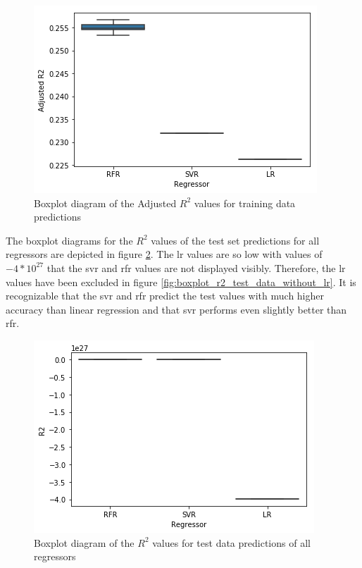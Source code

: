 \documentclass[a4paper, 11pt, oneside]{Thesis}  %
\begin{document}
\begin{figure}[h]
\includegraphics[scale=0.7]{Figures/Regressor_comparison/boxplot_adj_r2_training_data.png}
\centering
\caption{Boxplot diagram of the Adjusted $R^2$ values for training data predictions}
\label{fig:boxplot_adj_r2_training_data}
\end{figure}

The boxplot diagrams for the $R^2$ values of the test set predictions for all regressors are depicted in figure \ref{fig:boxplot_r2_test_data_all}. The \ac{lr} values are so low with values of $-4 * 10^{27}$ that the \ac{svr} and \ac{rfr} values are not displayed visibly. Therefore, the \ac{lr} values have been excluded in figure \ref{fig:boxplot_r2_test_data_without_lr}. It is recognizable that the \ac{svr} and \ac{rfr} predict the test values with much higher accuracy than linear regression and that \ac{svr} performs even slightly better than \ac{rfr}.

\begin{figure}[h]
\includegraphics[scale=0.7]{Figures/Regressor_comparison/boxplot_r2_test_data_all.png}
\centering
\caption{Boxplot diagram of the $R^2$ values for test data predictions of all regressors}
\label{fig:boxplot_r2_test_data_all}
\end{figure}
\end{document}
